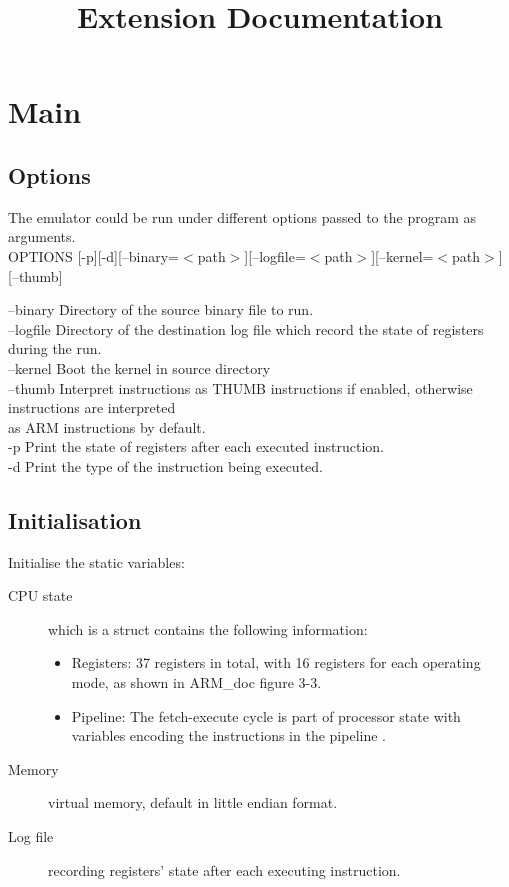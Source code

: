 \documentclass{article}
\begin{document}
\title{Extension Documentation}
\date{\vspace{-5ex}}
\maketitle

\section{Main}

\subsection{Options}
The emulator could be run under different options passed to the program as arguments.\\

OPTIONS [-p][-d][--binary=$<$path$>$][--logfile=$<$path$>$][--kernel=$<$path$>$][--thumb]
\begin{tabbing}
--binary \= Directory of the source binary file to run. \\
--logfile \> Directory of the destination log file which record the state of registers during the run. \\
--kernel \> Boot the kernel in source directory \\
--thumb \> Interpret instructions as THUMB instructions if enabled, otherwise instructions are interpreted \\\> as ARM instructions by default.\\
-p \> Print the state of registers after each executed instruction. \\
-d \> Print the type of the instruction being executed. \\
\end{tabbing} 

\subsection{Initialisation}
Initialise the static variables:

\begin{description}
\item[CPU state] which is a struct contains the following information:
\begin{itemize}
\item Registers: 37 registers in total, with 16 registers for each operating mode, as shown in ARM\_doc figure 3-3.
\item Pipeline: The fetch-execute cycle is part of processor state with variables encoding the instructions in the pipeline .
\end{itemize}

\item[Memory] virtual memory, default in little endian format.

\item[Log file] recording registers' state after each executing instruction.
\end{description}
\end{document}
